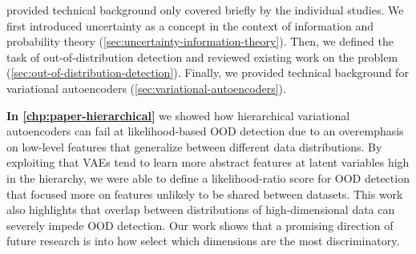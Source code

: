 \vspace{1em}
\textbf{} provided technical background only covered briefly by the individual studies. We first introduced uncertainty as a concept in the context of information and probability theory (\cref{sec:uncertainty-information-theory}). Then, we defined the task of out-of-distribution detection and reviewed existing work on the problem (\cref{sec:out-of-distribution-detection}). Finally, we provided technical background for variational autoencoders (\cref{sec:variational-autoencoders}).

\vspace{1em}
\textbf{In \cref{chp:paper-hierarchical}} we showed how hierarchical variational autoencoders can fail at likelihood-based OOD detection due to an overemphasis on low-level features that generalize between different data distributions. By exploiting that VAEs tend to learn more abstract features at latent variables high in the hierarchy, we were able to define a likelihood-ratio score for OOD detection that focused more on features unlikely to be shared between datasets. 
This work also highlights that overlap between distributions of high-dimensional data can severely impede OOD detection. Our work shows that a promising direction of future research is into how select which dimensions are the most discriminatory.


